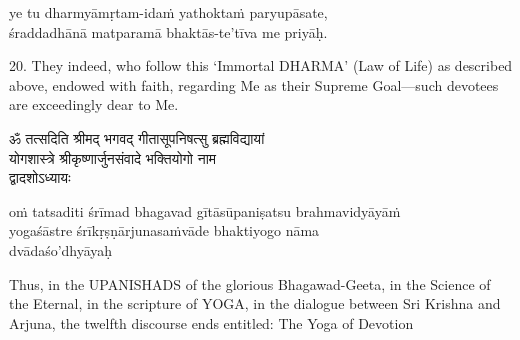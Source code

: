 \begin{transliteration}
ye tu dharmyāmṛtam-idaṁ yathoktaṁ paryupāsate, \\
śraddadhānā matparamā bhaktās-te'tīva me priyāḥ.
\end{transliteration}

20. They indeed, who follow this `Immortal DHARMA' (Law of Life) as described
above, endowed with faith, regarding Me as their Supreme Goal---such devotees
are exceedingly dear to Me.

\begin{gitaverse}
ॐ तत्सदिति श्रीमद् भगवद् गीतासूपनिषत्सु ब्रह्मविद्यायां \\
योगशास्त्रे श्रीकृष्णार्जुनसंवादे भक्तियोगो नाम \\
द्वादशोऽध्यायः
\end{gitaverse}

\begin{transliteration}
oṁ tatsaditi śrīmad bhagavad gītāsūpaniṣatsu brahmavidyāyāṁ \\
yogaśāstre śrīkṛṣṇārjunasaṁvāde bhaktiyogo nāma \\
dvādaśo'dhyāyaḥ
\end{transliteration}

Thus, in the UPANISHADS of the glorious Bhagawad-Geeta, in the Science of the
Eternal, in the scripture of YOGA, in the dialogue between Sri Krishna and
Arjuna, the twelfth discourse ends entitled: The Yoga of Devotion

